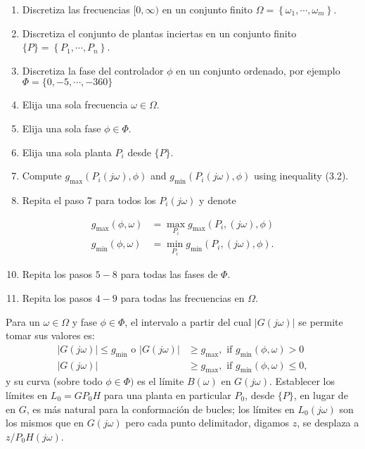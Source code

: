 \begin{enumerate}
  \item Discretiza las frecuencias $[0, \infty)$ en un conjunto finito $\Omega=\left\{\omega_{1}, \cdots, \omega_{m}\right\}$.

  \item Discretiza el conjunto de plantas inciertas en un conjunto finito $\{P\}=\left\{P_{1}, \cdots, P_{n}\right\}$.

  \item Discretiza la fase del controlador $\phi$ en un conjunto ordenado, por ejemplo $\Phi=\{0,-5, \cdots,-360\}$

  \item Elija una sola frecuencia $\omega \in \Omega$.

  \item Elija una sola fase $\phi \in \Phi$.

  \item Elija una sola planta $P_{i}$ desde $\{P\}$.

  \item Compute $g_{\max }\left(P_{i}(j \omega), \phi\right)$ and $g_{\min }\left(P_{i}(j \omega), \phi\right)$ using inequality (3.2).

  \item Repita el paso 7 para todos los $P_{i}(j \omega)$ y denote

\end{enumerate}
$$
\begin{aligned}
g_{\max }(\phi, \omega) &=\max _{P_{i}} g_{\max }\left(P_{i},(j \omega), \phi\right) \\
g_{\min }(\phi, \omega) &=\min _{P_{i}} g_{\min }\left(P_{i},(j \omega), \phi\right) .
\end{aligned}
$$

\begin{enumerate}
  \setcounter{enumi}{9}
  \item Repita los pasos $5-8$ para todas las fases de $\Phi$.

  \item Repita los pasos $4-9$ para todas las frecuencias en $\Omega$.

\end{enumerate}
Para un $\omega \in \Omega$ y fase $\phi \in \Phi$, el intervalo a partir del cual $| G(j \omega)|$ se permite tomar sus valores es:
$$
\begin{aligned}
| G(j \omega)| \leq g_{\min } \text { o }| G(j \omega)| & \geq g_{\max }, \text { if } g_{\min }(\phi, \omega)>0 \\
| G(j \omega)| & \geq g_{\max }, \text { if } g_{\min }(\phi, \omega) \leq 0,
\end{aligned}
$$
y su curva (sobre todo $\phi \in \Phi)$ es el límite $B(\omega)$ en $G(j \omega)$. Establecer los límites en $L_{0}=G P_{0} H$ para una planta en particular $P_{0}$, desde $\{P\}$, en lugar de en $G$, es más natural para la conformación de bucles; los límites en $L_{0}(j \omega)$ son los mismos que en $G(j \omega)$ pero cada punto delimitador, digamos $z$, se desplaza a $z / P_{0} H(j \omega)$.

